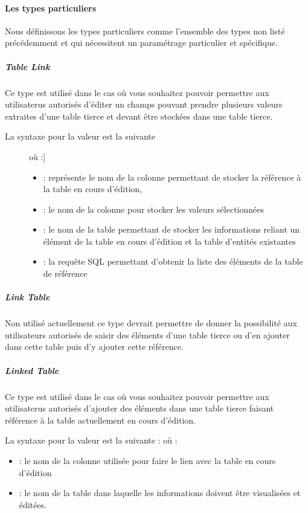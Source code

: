 \documentclass[letterpaper,10pt,french]{sphinxmanual}
\begin{document}
\paragraph{Les types particuliers}
\label{tables/infopanel:les-types-particuliers}
Nous définissons les types particuliers comme l'ensemble des types non
listé précédemment et qui nécessitent un paramétrage particulier et
spécifique.


\subparagraph{Table Link}
\label{tables/infopanel:table-link}
Ce type est utilisé dans le cas où vous souhaitez pouvoir permettre
aux utilisaterus autorisés d'éditer un champs pouvant prendre
plusieurs valeurs extraites d'une table tierce et devant être stockées
dans une table tierce.
\begin{description}
\item[{La syntaxe pour la valeur est la suivante}] \leavevmode{[} où :{]}\begin{itemize}
\item {} 
 : représente le nom de la colonne permettant de stocker la
référence à la table en cours d'édition,

\item {} 
 : le nom de la colonne pour stocker les valeurs sélectionnées

\item {} 
 : le nom de la table permettant de stocker les informations
reliant un élément de la table en cours d'édition et la table
d'entités existantes

\item {} 
 : la requête SQL permettant d'obtenir la liste des éléments
de la table de référence

\end{itemize}

\end{description}


\subparagraph{Link Table}
\label{tables/infopanel:link-table}
Non utilisé actuellement ce type devrait permettre de donner la
possibilité aux utilisateurs autorisés de saisir des éléments d'une
table tierce ou d'en ajouter dans cette table puis d'y ajouter cette
référence.


\subparagraph{Linked Table}
\label{tables/infopanel:linked-table}
Ce type est utilisé dans le cas où vous souhaitez pouvoir permettre
aux utilisaterus autorisés d'ajouter des éléments dans une table
tierce faisant référence à la table actuellement en cours d'édition.

La syntaxe pour la valeur est la suivante :  où :
\begin{itemize}
\item {} 
 : le nom de la colonne utilisée pour faire le lien avec la
table en cours d'édition

\item {} 
 : le nom de la table dans laquelle les informations doivent
être visualisées et éditées.

\end{itemize}
\end{document}
